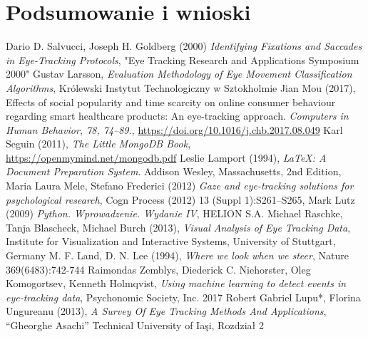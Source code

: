 \documentclass[14pt,a4paper,twoside,openright,titlepage]{extbook}
\begin{document}
    \chapter{Podsumowanie i wnioski}
        \blindtext
    \backmatter
    \fancyhf{}
    \pagestyle{plain}
    \renewcommand{\headrulewidth}{0pt}
    \begin{thebibliography}{99}
            Dario D. Salvucci, Joseph H. Goldberg (2000)
            \emph{Identifying Fixations and Saccades in Eye-Tracking Protocols},
            "Eye Tracking Research and Applications Symposium 2000"
            Gustav Larsson,
            \emph{Evaluation Methodology of Eye
            Movement Classification Algorithms},
            Królewski Instytut Technologiczny w Sztokholmie
            Jian Mou (2017),
            Effects of social popularity and time scarcity on online consumer behaviour regarding smart healthcare products: An eye-tracking approach. \emph{Computers in Human Behavior, 78, 74–89.},
            \url{https://doi.org/10.1016/j.chb.2017.08.049}
            Karl Seguin (2011),
            \emph{The Little MongoDB Book},\\
            \url{https://openmymind.net/mongodb.pdf}
            Leslie Lamport (1994),
            \emph{\LaTeX: A Document Preparation System}.
            Addison Wesley, Massachusetts,
            2nd Edition,
            Maria Laura Mele, Stefano Frederici (2012)
            \emph{Gaze and eye-tracking solutions for psychological research},
            Cogn Process (2012) 13 (Suppl 1):S261–S265,
            Mark Lutz (2009)
            \emph{Python. Wprowadzenie. Wydanie IV},
            HELION S.A.
            Michael Raschke, Tanja Blascheck, Michael Burch (2013),
            \emph{Visual Analysis of Eye Tracking Data},
            Institute for Visualization and Interactive Systems, University of Stuttgart, Germany
            M. F. Land, D. N. Lee (1994),
            \emph{Where we look when we steer},
            Nature 369(6483):742-744
            Raimondas Zemblys, Diederick C. Niehorster, Oleg Komogortsev, Kenneth Holmqvist,
            \emph{Using machine learning to detect events in eye-tracking data},
            Psychonomic Society, Inc. 2017
            Robert Gabriel Lupu*, Florina Ungureanu (2013),
            \emph{A Survey Of Eye Tracking Methods And Applications},
            “Gheorghe Asachi” Technical University of Iaşi,
            Rozdział 2
    \end{thebibliography}
\end{document}
